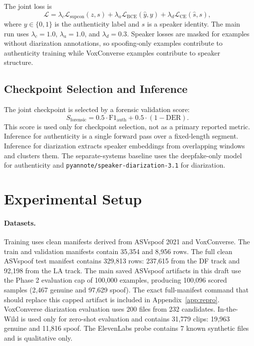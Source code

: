 \documentclass{article}
\newcommand{\asv}{ASVspoof}
\newcommand{\itw}{In-the-Wild}
\begin{document}
The joint loss is
\begin{equation}
  \mathcal{L}
  = \lambda_c \mathcal{L}_{\mathrm{supcon}}(z, s)
  + \lambda_a \mathcal{L}_{\mathrm{BCE}}(\hat{y}, y)
  + \lambda_d \mathcal{L}_{\mathrm{CE}}(\hat{s}, s),
  \label{eq:loss}
\end{equation}
where $y \in \{0,1\}$ is the authenticity label and $s$ is a speaker identity.
The main run uses $\lambda_c=1.0$, $\lambda_a=1.0$, and $\lambda_d=0.3$.
Speaker losses are masked for examples without diarization annotations, so
spoofing-only examples contribute to authenticity training while VoxConverse
examples contribute to speaker structure.

\subsection{Checkpoint Selection and Inference}

The joint checkpoint is selected by a forensic validation score:
\begin{equation}
  S_{\mathrm{forensic}} =
  0.5 \cdot \mathrm{F1}_{\mathrm{auth}} +
  0.5 \cdot (1 - \mathrm{DER}).
  \label{eq:forensic}
\end{equation}
This score is used only for checkpoint selection, not as a primary reported
metric.  Inference for authenticity is a single forward pass over a fixed-length
segment.  Inference for diarization extracts speaker embeddings from overlapping
windows and clusters them.  The separate-systems baseline uses the deepfake-only
model for authenticity and \texttt{pyannote/speaker-diarization-3.1} for
diarization.

\section{Experimental Setup}

\paragraph{Datasets.}
Training uses clean manifests derived from \asv{} 2021 \citep{liu2021asvspoof}
and VoxConverse.  The train and validation manifests contain 35,354 and 8,956
rows.  The full clean \asv{} test manifest contains 329,813 rows: 237,615 from
the DF track and 92,198 from the LA track.  The main saved \asv{} artifacts in
this draft use the Phase 2 evaluation cap of 100,000 examples, producing
100,096 scored samples (2,467 genuine and 97,629 spoof).  The exact
full-manifest command that should replace this capped artifact is included in
Appendix~\ref{app:repro}.  VoxConverse diarization evaluation uses 200 files
from 232 candidates.  \itw{} is used only for zero-shot evaluation and contains
31,779 clips: 19,963 genuine and 11,816 spoof.  The ElevenLabs probe contains 7
known synthetic files and is qualitative only.
\end{document}
